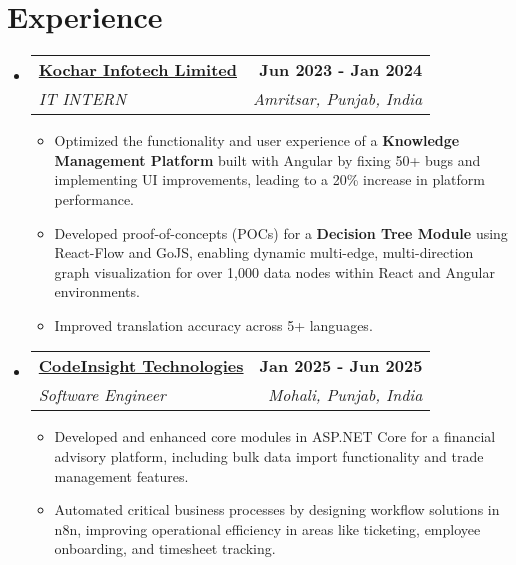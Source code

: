 \documentclass[letterpaper,11pt]{article}
\makeatletter
\newcommand{\resumeItem}[1]{
  \item\small{
    {#1 \vspace{-2pt}}
  }
}
\newcommand{\resumeSubheading}[4]{
  \vspace{-2pt}\item
    \begin{tabular*}{1.0\textwidth}[t]{l@{\extracolsep{\fill}}r}
      \textbf{#1} & \textbf{\small #2} \\
      \textit{\small#3} & \textit{\small #4} \\
    \end{tabular*}\vspace{-7pt}
}
\newcommand{\resumeSubHeadingListStart}{\begin{itemize}[leftmargin=0.0in, label={}]}
\newcommand{\resumeSubHeadingListEnd}{\end{itemize}}
\newcommand{\resumeItemListStart}{\justify \begin{itemize} \vspace{-4pt}}
\newcommand{\resumeItemListEnd}{\end{itemize}\vspace{-1pt}}
\makeatother
\begin{document}
\section{Experience}
  \resumeSubHeadingListStart
    \resumeSubheading
      {\href{https://www.kochartech.com/}{Kochar Infotech Limited}}{Jun 2023 - Jan 2024}
      {IT INTERN}{Amritsar, Punjab, India}
      \resumeItemListStart
        \resumeItem{Optimized the functionality and user experience of a \textbf{Knowledge Management Platform} built with Angular by fixing 50+ bugs and implementing UI improvements, leading to a 20\% increase in platform performance.}
        \resumeItem{Developed proof-of-concepts (POCs) for a \textbf{Decision Tree Module} using React-Flow and GoJS, enabling dynamic multi-edge, multi-direction graph visualization for over 1,000 data nodes within React and Angular environments.}
        \resumeItem{Improved translation accuracy across 5+ languages.}
      \resumeItemListEnd
    
    \resumeSubheading
      {\href{https://www.thecodeinsight.com/}{CodeInsight Technologies}}{Jan 2025 - Jun 2025}
      {Software Engineer}{Mohali, Punjab, India}
      \resumeItemListStart
        \resumeItem{Developed and enhanced core modules in ASP.NET Core for a financial advisory platform, including bulk data import functionality and trade management features.}
        \resumeItem{Automated critical business processes by designing workflow solutions in n8n, improving operational efficiency in areas like ticketing, employee onboarding, and timesheet tracking.}
      \resumeItemListEnd
  \resumeSubHeadingListEnd




\end{document}
